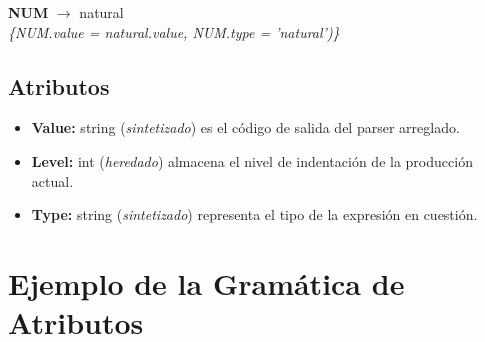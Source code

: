\documentclass[10pt,a4paper]{article}
\begin{document}
\textbf{NUM} $\rightarrow$ natural \\
\textit{\{NUM.value = natural.value, NUM.type = 'natural')\}}  \\ 

\subsection{Atributos}

\begin{itemize}
\item \textbf{Value:} string (\textit{sintetizado}) es el código de salida del parser arreglado.
\item \textbf{Level:} int (\textit{heredado}) almacena el nivel de indentación de la producción actual.
\item \textbf{Type:} string (\textit{sintetizado}) representa el tipo de la expresión en cuestión.
\end{itemize}

\section{Ejemplo de la Gramática de Atributos}
\end{document}
